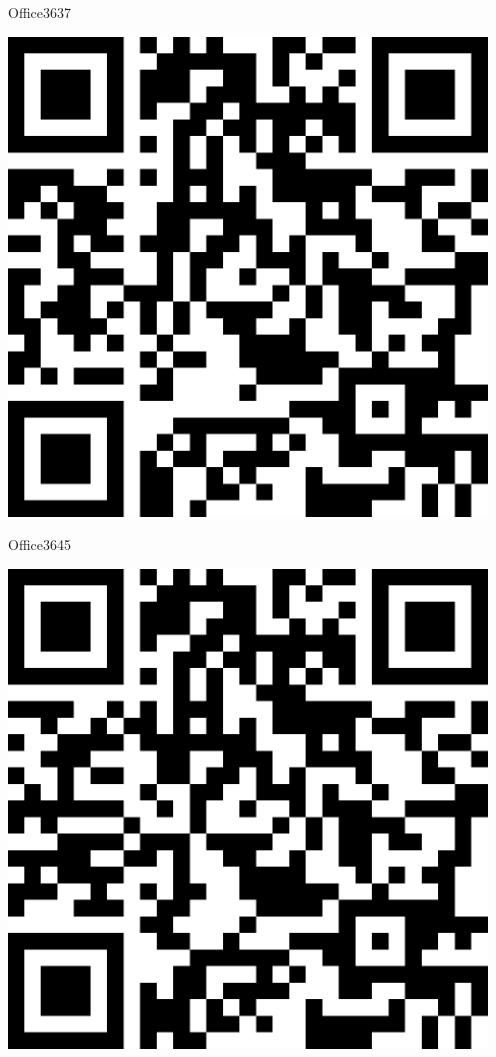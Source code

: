 \documentclass[letterpaper]{article}
\begin{document}
 \hfill{\small Office3637} 

 \vspace{1in} 
 \pagebreak 
{} 
 \vspace*{\fill} 
 \begingroup 
 \centerline{\includegraphics[scale=1,width=5in,height=5in]{Office3645.png}} 
 \endgroup 
 \vspace*{\fill} 

 \hfill{\small Office3645} 

 \vspace{1in} 
 \pagebreak 
{} 
 \vspace*{\fill} 
 \begingroup 
 \centerline{\includegraphics[scale=1,width=5in,height=5in]{Office3647.png}} 
 \endgroup 
 \vspace*{\fill} 
\end{document}
